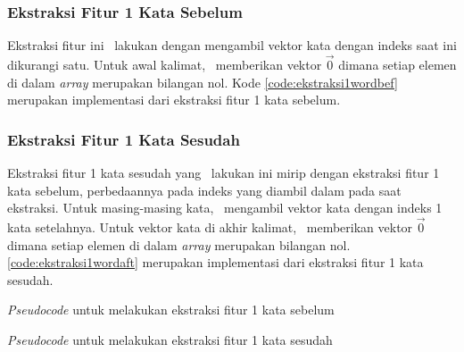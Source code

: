 \subsubsection{Ekstraksi Fitur 1 Kata Sebelum}
Ekstraksi fitur ini \saya~lakukan dengan mengambil vektor kata dengan indeks saat ini dikurangi satu. Untuk awal kalimat, \saya~memberikan vektor $ \vec{0} $ dimana setiap elemen di dalam \textit{array} merupakan bilangan nol. Kode \ref{code:ekstraksi1wordbef} merupakan implementasi dari ekstraksi fitur 1 kata sebelum.

\subsubsection{Ekstraksi Fitur 1 Kata Sesudah}
Ekstraksi fitur 1 kata sesudah yang \saya~lakukan ini mirip dengan ekstraksi fitur 1 kata sebelum, perbedaannya pada indeks yang diambil dalam pada saat ekstraksi. Untuk masing-masing kata, \saya~mengambil vektor kata dengan indeks 1 kata setelahnya. Untuk vektor kata di akhir kalimat, \saya~memberikan vektor $ \vec{0} $ dimana setiap elemen di dalam \textit{array} merupakan bilangan nol. \ref{code:ekstraksi1wordaft} merupakan implementasi dari ekstraksi fitur 1 kata sesudah.

\begin{kode}	
	
	\SetAlgoLined

	\BlankLine
	
	\caption{\textit{Pseudocode} untuk melakukan ekstraksi fitur 1 kata sebelum}
	\label{code:ekstraksi1wordbef}	
\end{kode}

\begin{kode}
	
	
	\SetAlgoLined
	
	\BlankLine	
	\caption{\textit{Pseudocode} untuk melakukan ekstraksi fitur 1 kata sesudah}
	\label{code:ekstraksi1wordaft}
\end{kode}

